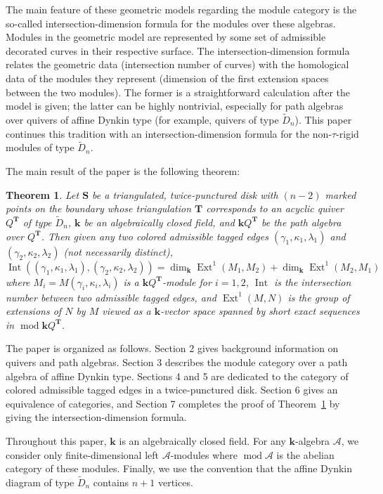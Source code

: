 \documentclass[11pt]{amsart}
\theoremstyle{plain}
\newtheorem{thmx}{Theorem}
\theoremstyle{definition}
\numberwithin{equation}{section}
\def\surf{\mathbf{S}}                       %
\def\TT{\mathbf{T}}
\renewcommand{\k}{\mathbf{k}}
\renewcommand{\mod}{\operatorname{mod}}
\newcommand{\Int}{\operatorname{Int}}
\newcommand{\Ext}{\operatorname{Ext}}
\begin{document}
The main feature of these geometric models regarding the module category is the so-called intersection-dimension formula for the modules over these algebras.
Modules in the geometric model are represented by some set of admissible decorated curves in their respective surface. 
The intersection-dimension formula relates the geometric data (intersection number of curves) with the homological data of the modules they represent (dimension of the first extension spaces between the two modules).
The former is a straightforward calculation after the model is given; the latter can be highly nontrivial, especially for path algebras over quivers of affine Dynkin type (for example, quivers of type $\widetilde{D}_n$).
This paper continues this tradition with an intersection-dimension formula for the non-$\tau$-rigid modules of type $\widetilde{D}_n$.

The main result of the paper is the following theorem:
\begin{thmx} \label{main-thm}
    Let $\surf$ be a triangulated, twice-punctured disk with $(n-2)$ marked points on the boundary whose triangulation $\TT$ corresponds to an acyclic quiver $Q^\TT$ of type $\widetilde{D}_n$, $\k$ be an algebraically closed field, and $\k Q^\TT$ be the path algebra over $Q^\TT$. 
    Then given any two colored admissible tagged edges $(\gamma_1, \kappa_1, \lambda_1)$ and $(\gamma_2, \kappa_2, \lambda_2)$ (not necessarily distinct), 
    $$\Int((\gamma_1, \kappa_1, \lambda_1), (\gamma_2, \kappa_2, \lambda_2)) = \dim_\k \Ext^1 (M_1, M_2) + \dim_\k \Ext^1 (M_2, M_1)$$ where $M_i = M(\gamma_i,\kappa_i, \lambda_i)$ is a $\k Q^\TT$-module for $i =1,2$, $\Int$ is the intersection number between two admissible tagged edges, and $\Ext^1(M,N)$ is the group of extensions of $N$ by $M$ viewed as a $\k$-vector space spanned by short exact sequences in $\mod \k Q^\TT$.
\end{thmx}

The paper is organized as follows.
Section 2 gives background information on quivers and path algebras. 
Section 3 describes the module category over a path algebra of affine Dynkin type.
Sections 4 and 5 are dedicated to the category of colored admissible tagged edges in a twice-punctured disk.
Section 6 gives an equivalence of categories, and Section 7 completes the proof of Theorem~\ref{main-thm} by giving the intersection-dimension formula.

Throughout this paper, $\k$ is an algebraically closed field.
For any $\k$-algebra $\mathcal{A}$, we consider only finite-dimensional left $\mathcal{A}$-modules where $\mod \mathcal{A}$ is the abelian category of these modules.
Finally, we use the convention that the affine Dynkin diagram of type $\widetilde{D}_n$ contains $n+1$ vertices.
\end{document}
